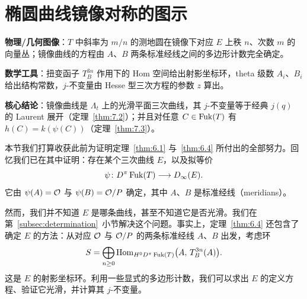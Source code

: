 
\section{椭圆曲线镜像对称的图示}
\label{sec:illus}

\begin{keytakeaways}
  \item \textbf{物理/几何图像}：$T$ 中斜率为 $m/n$ 的测地圆在镜像下对应 $E$ 上秩 $n$、次数 $m$ 的向量丛；镜像曲线的方程由 $A$、$B$ 两条标准经线之间的多边形计数完全确定。
  \item \textbf{数学工具}：扭变函子 $T_B^{3n}$ 作用下的 Hom 空间给出射影坐标环，theta 级数 $A_i$、$B_i$ 给出结构常数，$j$-不变量由 Hesse 型三次方程的参数 $z$ 算出。
  \item \textbf{核心结论}：镜像曲线是 $\Lambda_t$ 上的光滑平面三次曲线，其 $j$-不变量等于经典 $j(q)$ 的 Laurent 展开（定理~\ref{thm:7.2}）；并且对任意 $C\in\operatorname{Fuk}(T)$ 有 $h(C)=k(\psi(C))$（定理~\ref{thm:7.3}）。
\end{keytakeaways}

本节我们打算收获此前为证明定理~\ref{thm:6.1} 与~\ref{thm:6.4} 所付出的全部努力。回忆我们已在其中证明：存在某个三次曲线 $E$，以及拟等价
\[
\psi\colon D^\pi\operatorname{Fuk}(T)\longrightarrow D_\infty(E).
\]
它由 $\psi(A)=\mathcal{O}$ 与 $\psi(B)=\mathcal{O}/P$ 确定，其中 $A$、$B$ 是标准经线（meridians）。

然而，我们并不知道 $E$ 是哪条曲线，甚至不知道它是否光滑。我们在第~\ref{subsec:determination}~小节解决这个问题。事实上，定理~\ref{thm:6.4} 还包含了确定 $E$ 的方法：从对应 $\mathcal{O}$ 与 $\mathcal{O}/P$ 的两条标准经线 $A$、$B$ 出发，考虑环
\[
S=\bigoplus_{n\ge 0}\operatorname{Hom}_{H^0D^\pi\operatorname{Fuk}(T)}\bigl(A,\,T_B^{3n}(A)\bigr).
\]
这是 $E$ 的射影坐标环。利用一些显式的多边形计数，我们可以求出 $E$ 的定义方程、验证它光滑，并计算其 $j$-不变量。


